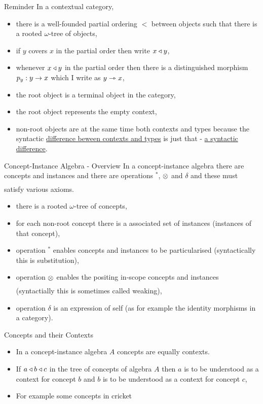 \begin{frame}{Reminder}
In a contextual category,
\begin{itemize}
\item there is a well-founded partial ordering $<$ between objects
such that there is  a rooted $\omega$-tree of objects,
\item if $y$ covers $x$ in the partial order then write $x \triangleleft y$,
\item whenever $x \triangleleft y$ in the partial order then there is a distinguished
morphism $p_y:y \rightarrow x$ which I write as $y \rightarrowtriangle x$,
\item the root object is a terminal object in the category,
\item the root object represents the empty context, 
\item non-root objects are at the same time both contexts and types
because the syntactic \underline{difference beween contexts and types} is 
just that - \underline{a syntactic difference}. 
\end{itemize}
\end{frame}

\begin{frame}{Concept-Instance Algebra -  Overview}
In a concept-instance algebra there are concepts and instances and there are operations $^*$, $\underset{}{\otimes}$ and $\delta$
and these must satisfy various axioms.
\begin{itemize}
\item there is a rooted $\omega$-tree of concepts,
\item for each non-root concept there is a associated set of instances (instances of that concept),
\item operation $^*$ enables  concepts and instances to be particularised (syntactically this is substitution),
\item  operation $\underset{}{\otimes}$ enables the positing in-scope concepts and instances (syntactially this is sometimes called weaking),
\item operation $\delta$ is an expression of self (as for example the identity morphisms in a category).
\end{itemize}
\end{frame}

\begin{frame}{Concepts and their Contexts}
\begin{itemize}
\item In a concept-instance algebra $A$ concepts are equally contexts.
\item If $a \triangleleft b \triangleleft c$ in the tree of concepts of algebra $A$ 
then $a$ is to be understood as a context for concept $b$ and $b$ is to be understood as a context for concept $c$,
\item For example some concepts in cricket

\end{itemize} 
\end{frame}


